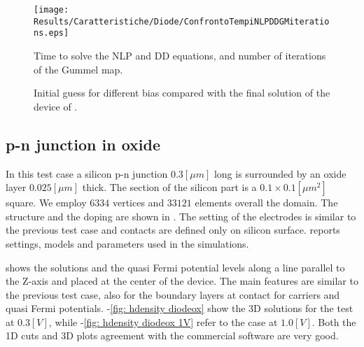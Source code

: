  
 \begin{figure}[!t]
\centering
\texttt{[image: Results/Caratteristiche/Diode/ConfrontoTempiNLPDDGMiterations.eps]}
\caption{Time to solve the NLP and DD equations, and number of  iterations of the Gummel map.}
\label{fig: tempi computazionali 2}
\end{figure}

\begin{figure}[!b]
\centering
{}
\caption{Initial guess for different bias compared with the final solution of the device of .}
\label{fig: different biast initial step}
\end{figure}
 



\clearpage


\subsection{p-n junction in oxide}
\label{sec: PNOX}

In this test case a silicon p-n junction $0.3[\mu m]$ long is surrounded by an oxide layer $0.025[\mu m]$ thick. The section of the silicon part is a $0.1 \times 0.1 [\mu m^2]$ square.  We employ $6334$ vertices and $33121$ elements overall the domain. The structure and the doping are shown in . The setting of the electrodes is similar to the previous test case and contacts are defined only on silicon surface. 
 reports settings, models and parameters used in the simulations.

 shows the solutions and the quasi Fermi potential levels along a line parallel to the Z-axis and placed at the center of the device. The main features are similar to the previous test case, also for the boundary layers at contact for carriers and quasi Fermi potentials.
-\ref{fig: hdensity diodeox} show the 3D solutions for the test at $0.3[V]$, while -\ref{fig: hdensity diodeox 1V} refer to the case at $1.0[V]$. Both the 1D cuts and 3D plots agreement with the commercial software are very good. 

\vspace{0.5cm}

